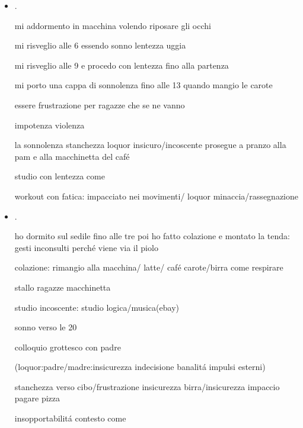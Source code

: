 \begin{itemize}
impulso/rabbia assistere manifestazione legame: 

prova capacit\'s interagire tramite la domanda: sensazione loquor impossibilit\'a riflessa colpa non aver domandato

\item {}.

mi addormento in macchina volendo riposare gli occhi

mi risveglio alle 6 essendo sonno lentezza uggia

mi risveglio alle 9 e procedo con lentezza fino alla partenza

mi porto una cappa di sonnolenza fino alle 13 quando mangio le carote

essere frustrazione per ragazze che se ne vanno 


impotenza violenza

la sonnolenza stanchezza loquor insicuro/incoscente prosegue a pranzo alla pam e alla macchinetta del caf\'e

studio con lentezza come 

workout con fatica: impacciato nei movimenti/ loquor minaccia/rassegnazione


\item {}.

ho dormito sul sedile fino alle tre poi ho fatto colazione e montato la tenda: gesti inconsulti perch\'e viene via il piolo

colazione: rimangio alla macchina/ latte/ caf\'e carote/birra come respirare

stallo ragazze macchinetta

studio incoscente: studio logica/musica(ebay)

sonno verso le 20

colloquio grottesco con padre

(loquor:padre/madre:insicurezza indecisione banalit\'a impulsi esterni)

stanchezza verso cibo/frustrazione insicurezza birra/insicurezza impaccio pagare pizza

insopportabilit\'a contesto come 


\end{itemize}
